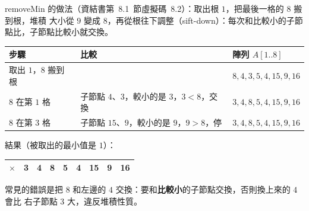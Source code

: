 \begin{pastsoln}
removeMin 的做法（資結書第~8.1~節虛擬碼~8.2）：取出根 $1$，把最後一格的 $8$ 搬到根，堆積
大小從 $9$ 變成 $8$，再從根往下調整（sift-down）：每次和比較小的子節點比，子節點比較小就交換。
\begin{center}
\begin{tabular}{lll}
\toprule
步驟 & 比較 & 陣列 $A[1..8]$ \\
\midrule
取出 $1$，$8$ 搬到根 & & $8, 4, 3, 5, 4, 15, 9, 16$ \\
$8$ 在第 $1$ 格 & 子節點 $4$、$3$，較小的是 $3$，$3 < 8$，交換 & $3, 4, 8, 5, 4, 15, 9, 16$ \\
$8$ 在第 $3$ 格 & 子節點 $15$、$9$，較小的是 $9$，$9 > 8$，停 & $3, 4, 8, 5, 4, 15, 9, 16$ \\
\bottomrule
\end{tabular}
\end{center}
結果（被取出的最小值是 $1$）：
\begin{center}
\begin{tabular}{|c|c|c|c|c|c|c|c|c|}\hline
$\times$ & 3 & 4 & 8 & 5 & 4 & 15 & 9 & 16\\\hline
\end{tabular}
\qquad
{}
\end{center}
常見的錯誤是把 $8$ 和左邊的 $4$ 交換：要和\textbf{比較小}的子節點交換，否則換上來的 $4$ 會比
右子節點 $3$ 大，違反堆積性質。
\end{pastsoln}
